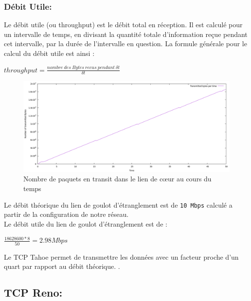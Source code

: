 \documentclass[a4paper,12pt]{article}
\begin{document}
\subsubsection{Débit Utile:}
Le débit utile (ou throughput) est le débit total en réception. Il est calculé pour un  intervalle 
de temps, en divisant la quantité totale d’information reçue pendant cet  intervalle, par la durée de 
l’intervalle en question. La formule générale pour le calcul du débit utile est ainsi :  
\begin{center}
$throughput=\frac{nombre \ des \ Bytes \ recus \ pendant\ \delta t }{\delta t}$
\end{center}
\begin{figure}[H]
\centering
\includegraphics[width=16cm]{img/paquets_received_tahoe.png}
\caption{Nombre de paquets en transit dans le lien de cœur au cours du temps}
\end{figure}
Le débit théorique du lien de goulot d'étranglement est de \texttt{10 Mbps} calculé a partir de la configuration de notre réseau.\\
Le débit utile du lien de goulot d'étranglement est de : 
\begin{center}
	$\frac{18628600*8}{50} = 2.98 Mbps$ 
\end{center}
Le TCP Tahoe permet de transmettre les données avec un facteur proche d'un quart par rapport au débit théorique.  .


\subsection{TCP Reno:}
\end{document}
